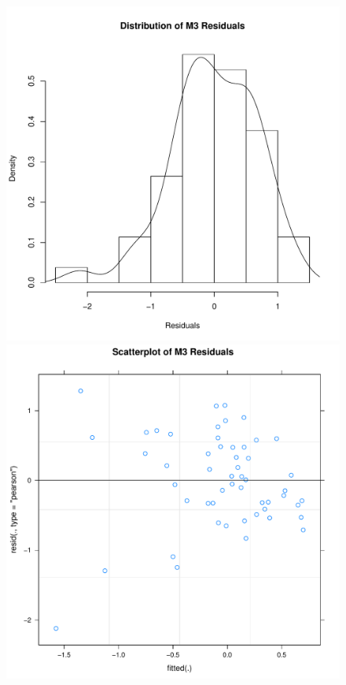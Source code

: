 \begin{figure}[htbp]
    \includegraphics[scale =.4]{images/TEM3Hist.pdf}
    \includegraphics[scale =.4]{images/TEM3Scatter.pdf}

\end{figure}
